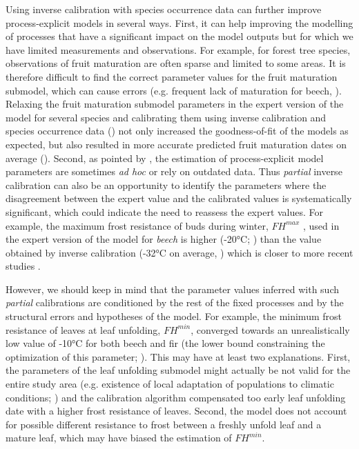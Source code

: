 Using inverse calibration with species occurrence data can further improve process-explicit models in several ways. First, it can help improving the modelling of processes that have a significant impact on the model outputs but for which we have limited measurements and observations. For example, for forest tree species, observations of fruit maturation are often sparse and limited to some areas. It is therefore difficult to find the correct parameter values for the fruit maturation submodel, which can cause errors (e.g. frequent lack of maturation for beech, ). Relaxing the fruit maturation submodel parameters in the expert version of the model for several species and calibrating them using inverse calibration and species occurrence data () not only increased the goodness-of-fit of the models as expected, but also resulted in more accurate predicted fruit maturation dates on average ().
Second, as pointed by \cite{Harrison2021}, the estimation of process-explicit model parameters are sometimes \emph{ad hoc} or rely on outdated data. Thus \emph{partial} inverse calibration can also be an opportunity to identify the parameters where the disagreement between the expert value and the calibrated values is systematically significant, which could indicate the need to reassess the expert values. For example, the maximum frost resistance of buds during winter, ${FH}^{max}$ , used in the expert version of the model for \emph{beech} is higher (-20°C; \citealt{Till1956, Lenz2013})  than the value obtained by inverse calibration (-32°C on average, ) which is closer to more recent studies \citep{Delaporte2015, Hofmann2015, Kreyling2014, Lenz2016}. 
 
However, we should keep in mind that the parameter values inferred with such \emph{partial} calibrations are conditioned by the rest of the fixed processes and by the structural errors and hypotheses of the model. For example, the minimum frost resistance of leaves at leaf unfolding, ${FH}^{min}$, converged towards an unrealistically low value of -10°C for both beech and fir (the lower bound constraining the optimization of this parameter; ). This may have at least two explanations. First, the parameters of the leaf unfolding submodel might actually be not valid for the entire study area (e.g. existence of local adaptation of populations to climatic conditions; \citealp{Kreyling2014}) and the calibration algorithm compensated too early leaf unfolding date with a higher frost resistance of leaves. Second, the model does not account for possible different resistance to frost between a freshly unfold leaf and a mature leaf, which may have biased the estimation of ${FH}^{min}$.  

